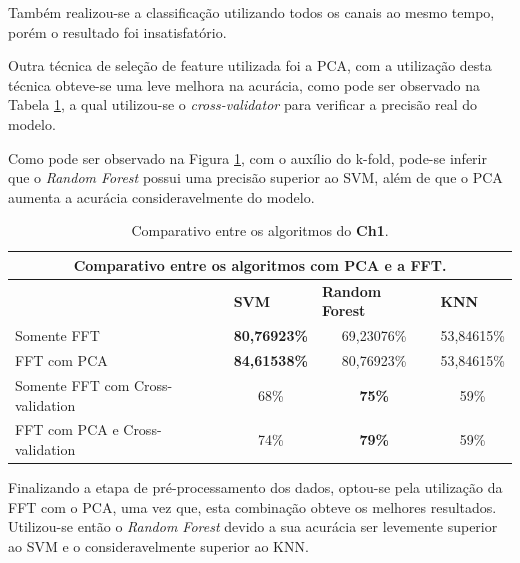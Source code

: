 Também realizou-se a classificação utilizando todos os canais ao mesmo tempo, porém o resultado foi insatisfatório.

Outra técnica de seleção de feature utilizada foi a PCA, com a utilização desta técnica obteve-se uma leve melhora na acurácia, como pode ser observado na Tabela \ref{pcavalidator}, a qual utilizou-se o \textit{cross-validator} para verificar a precisão real do modelo.

Como pode ser observado na Figura \ref{pcavalidator}, com o auxílio do k-fold, pode-se inferir que o \textit{Random Forest} possui uma precisão superior ao SVM, além de que o PCA aumenta a acurácia consideravelmente do modelo.


\begin{table}[]
\centering
\begin{tabular}{@{}lccc@{}}
\toprule
\multicolumn{4}{c}{Comparativo entre os algoritmos com PCA e a FFT.}                                                                                \\ \midrule
                                 & \multicolumn{1}{l}{\textbf{SVM}} & \multicolumn{1}{l}{\textbf{Random Forest}} & \multicolumn{1}{l}{\textbf{KNN}} \\
Somente FFT                      & \textbf{80,76923\%}              & 69,23076\%                                 & 53,84615\%                       \\
FFT com PCA                      & \textbf{84,61538\%}              & 80,76923\%                                 & 53,84615\%                       \\
Somente FFT com Cross-validation & 68\%                             & \textbf{75\%}                              & 59\%                             \\
FFT com PCA e Cross-validation   & 74\%                             & \textbf{79\%}                              & 59\%                             \\ \bottomrule
\end{tabular}
\caption{Comparativo entre os algoritmos do \textbf{Ch1}.}
\label{pcavalidator}
\end{table}




Finalizando a etapa de pré-processamento dos dados, optou-se pela utilização da FFT com o PCA, uma vez que, esta combinação obteve os melhores resultados. Utilizou-se então o \textit{Random Forest} devido a sua acurácia ser levemente superior ao SVM e o consideravelmente superior ao KNN.


